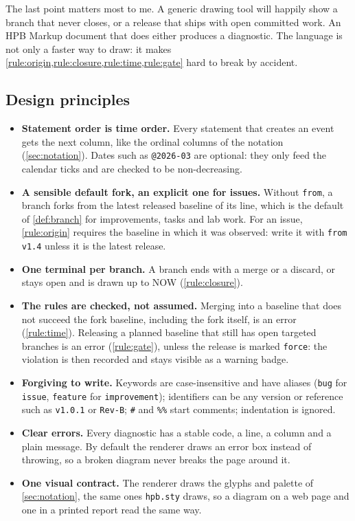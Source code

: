 The last point matters most to me. A generic drawing tool will happily
show a branch that never closes, or a release that ships with open
committed work. An HPB Markup document that does either produces a
diagnostic. The language is not only a faster way to draw: it makes
\cref{rule:origin,rule:closure,rule:time,rule:gate} hard to break by
accident.

\subsection{Design principles}
\label{sec:tooling-principles}

\begin{itemize}[leftmargin=1.5em,itemsep=2pt,topsep=3pt]
  \item \textbf{Statement order is time order.} Every statement that
        creates an event gets the next column, like the ordinal columns of
        the notation (\cref{sec:notation}). Dates such as \texttt{@2026-03}
        are optional: they only feed the calendar ticks and are checked to
        be non-decreasing.
  \item \textbf{A sensible default fork, an explicit one for issues.}
        Without \texttt{from}, a branch forks from the latest released
        baseline of its line, which is the default of \cref{def:branch} for
        improvements, tasks and lab work. For an issue, \cref{rule:origin}
        requires the baseline in which it was observed: write it with
        \texttt{from v1.4} unless it is the latest release.
  \item \textbf{One terminal per branch.} A branch ends with a merge or a
        discard, or stays open and is drawn up to NOW
        (\cref{rule:closure}).
  \item \textbf{The rules are checked, not assumed.} Merging into a
        baseline that does not succeed the fork baseline, including the
        fork itself, is an error (\cref{rule:time}). Releasing a planned
        baseline that still has open targeted branches is an error
        (\cref{rule:gate}), unless the release is marked \texttt{force}: the
        violation is then recorded and stays visible as a warning badge.
  \item \textbf{Forgiving to write.} Keywords are case-insensitive and have
        aliases (\texttt{bug} for \texttt{issue}, \texttt{feature} for
        \texttt{improvement}); identifiers can be any version or reference
        such as \texttt{v1.0.1} or \texttt{Rev-B}; \texttt{\#} and
        \texttt{\%\%} start comments; indentation is ignored.
  \item \textbf{Clear errors.} Every diagnostic has a stable code, a line,
        a column and a plain message. By default the renderer draws an
        error box instead of throwing, so a broken diagram never breaks the
        page around it.
  \item \textbf{One visual contract.} The renderer draws the glyphs and
        palette of \cref{sec:notation}, the same ones \texttt{hpb.sty}
        draws, so a diagram on a web page and one in a printed report read
        the same way.
\end{itemize}

